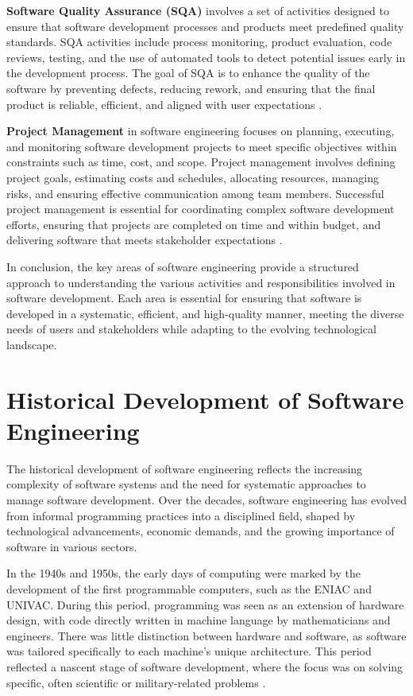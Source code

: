 \begin{refsection}
\textbf{Software Quality Assurance (SQA)} involves a set of activities designed to ensure that software development processes and products meet predefined quality standards. SQA activities include process monitoring, product evaluation, code reviews, testing, and the use of automated tools to detect potential issues early in the development process. The goal of SQA is to enhance the quality of the software by preventing defects, reducing rework, and ensuring that the final product is reliable, efficient, and aligned with user expectations \cite[pp.~345-348]{pressman2019software}.

\textbf{Project Management} in software engineering focuses on planning, executing, and monitoring software development projects to meet specific objectives within constraints such as time, cost, and scope. Project management involves defining project goals, estimating costs and schedules, allocating resources, managing risks, and ensuring effective communication among team members. Successful project management is essential for coordinating complex software development efforts, ensuring that projects are completed on time and within budget, and delivering software that meets stakeholder expectations \cite[pp.~412-415]{pressman2019software}.

In conclusion, the key areas of software engineering provide a structured approach to understanding the various activities and responsibilities involved in software development. Each area is essential for ensuring that software is developed in a systematic, efficient, and high-quality manner, meeting the diverse needs of users and stakeholders while adapting to the evolving technological landscape.

\section{Historical Development of Software Engineering}

The historical development of software engineering reflects the increasing complexity of software systems and the need for systematic approaches to manage software development. Over the decades, software engineering has evolved from informal programming practices into a disciplined field, shaped by technological advancements, economic demands, and the growing importance of software in various sectors.

In the 1940s and 1950s, the early days of computing were marked by the development of the first programmable computers, such as the ENIAC and UNIVAC. During this period, programming was seen as an extension of hardware design, with code directly written in machine language by mathematicians and engineers. There was little distinction between hardware and software, as software was tailored specifically to each machine's unique architecture. This period reflected a nascent stage of software development, where the focus was on solving specific, often scientific or military-related problems \cite[pp.~26-30]{ceruzzi2003history}.


\end{refsection}
